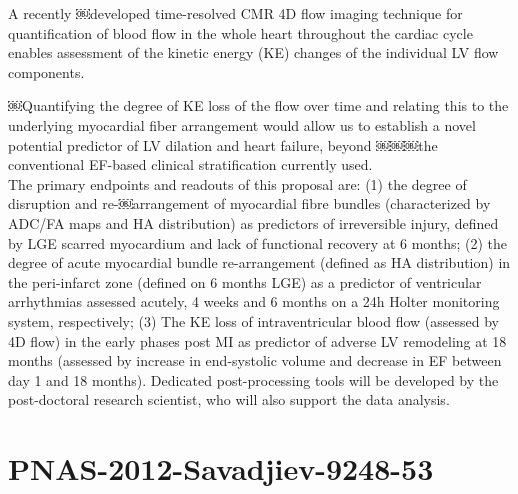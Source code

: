 A recently ￼developed time-resolved CMR 4D flow imaging technique for quantification of blood flow in the whole heart throughout the cardiac
cycle enables assessment of the kinetic energy (KE) changes of the individual LV flow components.

￼Quantifying the degree of KE loss of the flow over time and relating this to the underlying myocardial fiber arrangement would allow us to establish a novel potential predictor of LV dilation and heart failure, beyond
￼￼￼the conventional EF-based clinical stratification currently used.\\

The primary endpoints and readouts of this proposal are: (1) the degree of disruption and re-￼arrangement of myocardial fibre bundles (characterized by ADC/FA maps and HA distribution) as predictors of irreversible injury, defined by LGE scarred myocardium and lack of functional recovery at 6 months; (2) the degree of acute myocardial bundle re-arrangement (defined as HA distribution) in the peri-infarct zone (defined on 6 months LGE) as a predictor of ventricular arrhythmias assessed acutely, 4 weeks and 6 months on a 24h Holter monitoring system, respectively; (3) The KE loss of intraventricular blood flow (assessed by 4D flow) in the early phases post MI as predictor of adverse LV remodeling at 18 months (assessed by increase in end-systolic volume and decrease in EF between day 1 and 18 months). Dedicated post-processing tools will be developed by the post-doctoral research scientist, who will also
support the data analysis.

\section{PNAS-2012-Savadjiev-9248-53}

